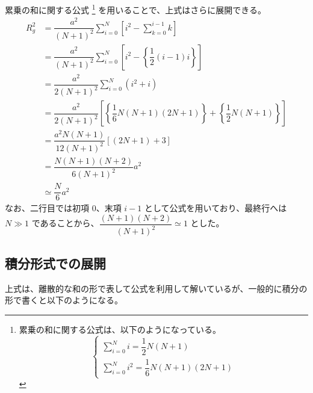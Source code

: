 \documentclass[uplatex,dvipdfmx,a4paper,11pt, titlepage]{jsarticle}
\begin{document}
\begin{appendix}
累乗の和に関する公式
\footnote{
累乗の和に関する公式は、以下のようになっている。
\begin{equation*}
\begin{cases}
\displaystyle \sum_{i=0}^{N} i = \dfrac{1}{2} N (N+1) \\[12pt]
\displaystyle \sum_{i=0}^{N} i^2 = \dfrac{1}{6} N (N+1)(2N+1)
\end{cases}
\end{equation*}
}
を用いることで、上式はさらに展開できる。
\begin{align*}
R_g^2
	&= \dfrac{a^2}{(N+1)^2} \sum_{i=0}^N \left[ i^2 - \sum_{k=0}^{i-1} k \right] \\
	&= \dfrac{a^2}{(N+1)^2} \sum_{i=0}^N \left[ i^2 - \left\{ \dfrac{1}{2} \left(i-1 \right) i \right\} \right] \\
	&= \dfrac{a^2}{2(N+1)^2} \sum_{i=0}^N (i^2 + i) \\
	&= \dfrac{a^2}{2(N+1)^2} \left[ \left\{ \dfrac{1}{6} N (N+1)(2N+1) \right\} + \left\{ \dfrac{1}{2} N (N + 1) \right\} \right] \\
	&= \dfrac{a^2 N(N+1)}{12(N+1)^2} [( 2N +1) +3] \\
	&= \dfrac{N(N+1)(N+2) }{6(N+1)^2} a^2\\
	&\simeq \dfrac{N}{6} a^2
\end{align*}
なお、二行目では初項 $0$、末項 $i-1$ として公式を用いており、最終行へは $N \gg 1$ であることから、$\dfrac{(N+1)(N+2) }{(N+1)^2}\simeq 1$ とした。


\subsection{積分形式での展開}


上式は、離散的な和の形で表して公式を利用して解いているが、一般的に積分の形で書くと以下のようになる。


\end{appendix}
\end{document}
